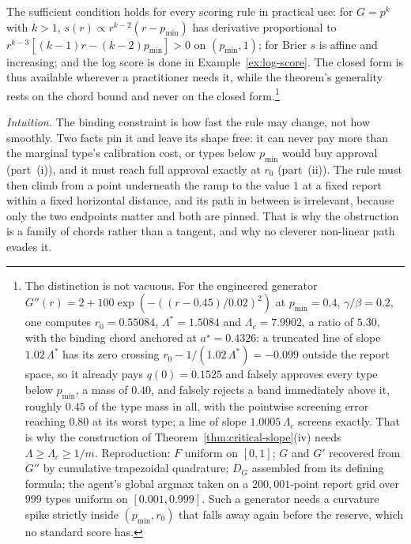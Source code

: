 \documentclass[acmsmall,nonacm,screen]{acmart}
\theoremstyle{acmplain}%
\theoremstyle{acmdefinition}%
\numberwithin{equation}{section}
\begin{document}
The sufficient condition holds for every scoring rule in practical use: for $G = p^k$ with $k > 1$, $s(r) \propto r^{k-2}(r-p_{\min})$ has derivative proportional to $r^{k-3}[(k-1)r - (k-2)p_{\min}] > 0$ on $(p_{\min},1)$; for Brier $s$ is affine and increasing; and the log score is done in Example~\ref{ex:log-score}. The closed form is thus available wherever a practitioner needs it, while the theorem's generality rests on the chord bound and never on the closed form.\footnote{The distinction is not vacuous. For the engineered generator $G''(r) = 2 + 100\exp(-((r-0.45)/0.02)^2)$ at $p_{\min} = 0.4$, $\gamma/\beta = 0.2$, one computes $r_0 = 0.55084$, $\Lambda^* = 1.5084$ and $\Lambda_c = 7.9902$, a ratio of $5.30$, with the binding chord anchored at $a^\star = 0.4326$: a truncated line of slope $1.02\,\Lambda^*$ has its zero crossing $r_0 - 1/(1.02\,\Lambda^*) = -0.099$ outside the report space, so it already pays $q(0) = 0.1525$ and falsely approves every type below $p_{\min}$, a mass of $0.40$, and falsely rejects a band immediately above it, roughly $0.45$ of the type mass in all, with the pointwise screening error reaching $0.80$ at its worst type; a line of slope $1.0005\,\Lambda_c$ screens exactly. That is why the construction of Theorem~\ref{thm:critical-slope}(iv) needs $\Lambda \ge \Lambda_c \ge 1/m$. Reproduction: $F$ uniform on $[0,1]$; $G$ and $G'$ recovered from $G''$ by cumulative trapezoidal quadrature; $D_G$ assembled from its defining formula; the agent's global argmax taken on a $200{,}001$-point report grid over $999$ types uniform on $[0.001,0.999]$. Such a generator needs a curvature spike strictly inside $(p_{\min},r_0)$ that falls away again before the reserve, which no standard score has.}

\emph{Intuition.} The binding constraint is how fast the rule may change, not how smoothly. Two facts pin it and leave its shape free: it can never pay more than the marginal type's calibration cost, or types below $p_{\min}$ would buy approval (part~(i)), and it must reach full approval exactly at $r_0$ (part~(ii)). The rule must then climb from a point underneath the ramp to the value $1$ at a fixed report within a fixed horizontal distance, and its path in between is irrelevant, because only the two endpoints matter and both are pinned. That is why the obstruction is a family of chords rather than a tangent, and why no cleverer non-linear path evades it.
\end{document}
